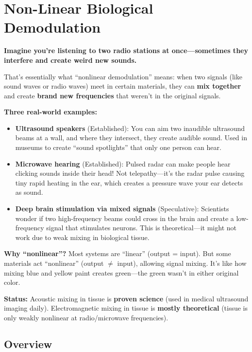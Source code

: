 \chapter{Non-Linear Biological Demodulation}
\label{ch:nonlinear-bio-demod}

\begin{nontechnical}
\textbf{Imagine you're listening to two radio stations at once---sometimes they interfere and create weird new sounds.}

That's essentially what ``nonlinear demodulation'' means: when two signals (like sound waves or radio waves) meet in certain materials, they can \textbf{mix together} and create \textbf{brand new frequencies} that weren't in the original signals.

\textbf{Three real-world examples:}
\begin{itemize}
\item \textbf{Ultrasound speakers} (Established): You can aim two inaudible ultrasound beams at a wall, and where they intersect, they create audible sound. Used in museums to create ``sound spotlights'' that only one person can hear.

\item \textbf{Microwave hearing} (Established): Pulsed radar can make people hear clicking sounds inside their head! Not telepathy---it's the radar pulse causing tiny rapid heating in the ear, which creates a pressure wave your ear detects as sound.

\item \textbf{Deep brain stimulation via mixed signals} (Speculative): Scientists wonder if two high-frequency beams could cross in the brain and create a low-frequency signal that stimulates neurons. This is theoretical---it might not work due to weak mixing in biological tissue.
\end{itemize}

\textbf{Why ``nonlinear''?} Most systems are ``linear'' (output = input). But some materials act ``nonlinear'' (output $\neq$ input), allowing signal mixing. It's like how mixing blue and yellow paint creates green---the green wasn't in either original color.

\textbf{Status:} Acoustic mixing in tissue is \textbf{proven science} (used in medical ultrasound imaging daily). Electromagnetic mixing in tissue is \textbf{mostly theoretical} (tissue is only weakly nonlinear at radio/microwave frequencies).
\end{nontechnical}

\section{Overview}


